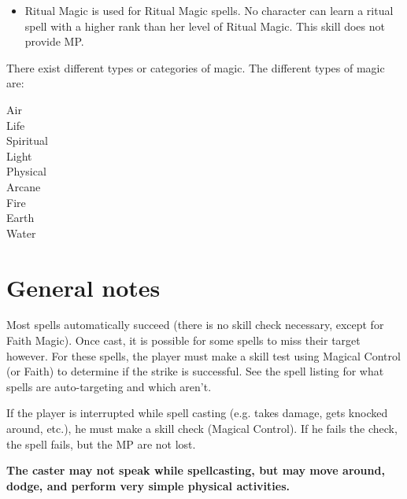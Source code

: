 \documentclass[twoside]{book}
\begin{document}
\begin{itemize}
  \item   Ritual Magic is used for Ritual Magic spells. No
                 character can learn a ritual spell with a higher rank
                 than her level of Ritual Magic. This skill does not
                 provide MP. 
\end{itemize}
  
    {  
     There exist different types or categories of magic.
               The different types of magic are: 
    }
  
\begin{description}
    
  \item[ Air ] 
  \item[ Life ] 
  \item[ Spiritual ] 
  \item[ Light ] 
  \item[ Physical ] 
  \item[ Arcane ] 
  \item[ Fire ] 
  \item[ Earth ] 
  \item[ Water ] 
\end{description}
  
    

\section{General notes}
    
    {  
     Most spells automatically succeed (there is no skill
             check necessary, except for Faith Magic). Once cast, it is
             possible for some spells to miss their target however. For
             these spells, the player must make a skill test using
             Magical Control (or Faith) to determine if the strike is
             successful. See the spell listing for what spells are
             auto-targeting and which aren't. 
    }
  
    {  
     If the player is interrupted while spell casting (e.g.
            takes damage, gets knocked around, etc.), he must make a
            skill check (Magical Control). If he fails the check, the
            spell fails, but the MP are not lost.
              

 \textbf{ The caster may not speak while spellcasting, but may
               move around, dodge, and perform very simple physical
               activities. }


          
    }
  
\end{document}
